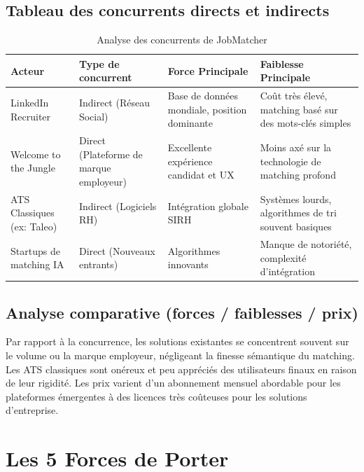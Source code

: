 \documentclass[12pt,a4paper]{report}
\begin{document}
\subsection{Tableau des concurrents directs et indirects}

\begin{table}[h]
\centering
\begin{tabular}{|p{3cm}|p{4cm}|p{4cm}|p{3.5cm}|}
\hline
\textbf{Acteur} & \textbf{Type de concurrent} & \textbf{Force Principale} & \textbf{Faiblesse Principale} \\
\hline
LinkedIn Recruiter & Indirect (Réseau Social) & Base de données mondiale, position dominante & Coût très élevé, matching basé sur des mots-clés simples \\
\hline
Welcome to the Jungle & Direct (Plateforme de marque employeur) & Excellente expérience candidat et UX & Moins axé sur la technologie de matching profond \\
\hline
ATS Classiques (ex: Taleo) & Indirect (Logiciels RH) & Intégration globale SIRH & Systèmes lourds, algorithmes de tri souvent basiques \\
\hline
Startups de matching IA & Direct (Nouveaux entrants) & Algorithmes innovants & Manque de notoriété, complexité d'intégration \\
\hline
\end{tabular}
\caption{Analyse des concurrents de JobMatcher}
\end{table}

\subsection{Analyse comparative (forces / faiblesses / prix)}
Par rapport à la concurrence, les solutions existantes se concentrent souvent sur le volume ou la marque employeur, négligeant la finesse sémantique du matching. Les ATS classiques sont onéreux et peu appréciés des utilisateurs finaux en raison de leur rigidité. Les prix varient d'un abonnement mensuel abordable pour les plateformes émergentes à des licences très coûteuses pour les solutions d'entreprise.

\section{Les 5 Forces de Porter}
\end{document}
